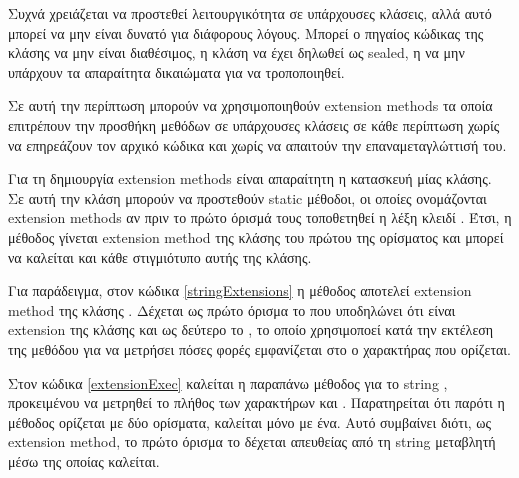 Συχνά χρειάζεται να προστεθεί λειτουργικότητα σε υπάρχουσες κλάσεις, αλλά αυτό μπορεί να μην είναι δυνατό για διάφορους λόγους. Μπορεί ο πηγαίος κώδικας της κλάσης να μην είναι διαθέσιμος, η κλάση να έχει δηλωθεί ως sealed, η να μην υπάρχουν τα απαραίτητα δικαιώματα για να τροποποιηθεί.

Σε αυτή την περίπτωση μπορούν να χρησιμοποιηθούν extension methods τα οποία επιτρέπουν την προσθήκη μεθόδων σε υπάρχουσες κλάσεις σε κάθε περίπτωση χωρίς να επηρεάζουν τον αρχικό κώδικα και χωρίς να απαιτούν την επαναμεταγλώττισή του.

Για τη δημιουργία extension methods είναι απαραίτητη η κατασκευή μίας  κλάσης. Σε αυτή την κλάση μπορούν να προστεθούν static μέθοδοι, οι οποίες ονομάζονται extension methods αν πριν το πρώτο όρισμά τους τοποθετηθεί η λέξη κλειδί . Έτσι, η μέθοδος γίνεται extension method της κλάσης του πρώτου της ορίσματος και μπορεί να καλείται και κάθε στιγμιότυπο αυτής της κλάσης.

Για παράδειγμα, στον κώδικα \ref{stringExtensions} η μέθοδος  αποτελεί extension method της κλάσης . Δέχεται ως πρώτο όρισμα το  που υποδηλώνει ότι είναι extension της κλάσης  και ως δεύτερο το , το οποίο χρησιμοποεί κατά την εκτέλεση της μεθόδου για να μετρήσει πόσες φορές εμφανίζεται στο  ο χαρακτήρας που ορίζεται. 



Στον κώδικα \ref{extensionExec} καλείται η παραπάνω μέθοδος για το string , προκειμένου να μετρηθεί το πλήθος των χαρακτήρων  και . Παρατηρείται ότι παρότι η μέθοδος ορίζεται με δύο ορίσματα, καλείται μόνο με ένα. Αυτό συμβαίνει διότι, ως extension method, το πρώτο όρισμα το δέχεται απευθείας από τη string μεταβλητή μέσω της οποίας καλείται.

